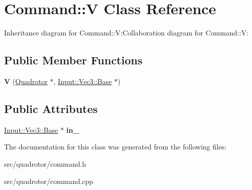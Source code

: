 \hypertarget{classCommand_1_1V}{
\section{Command::V Class Reference}
\label{classCommand_1_1V}
}
Inheritance diagram for Command::V:Collaboration diagram for Command::V:\subsection*{Public Member Functions}
\begin{DoxyCompactItemize}
\item 
\hypertarget{classCommand_1_1V_ab0f8e91d15ed03f3b5320314575c65ff}{
{\bfseries V} (\hyperlink{classQuadrotor}{Quadrotor} $\ast$, \hyperlink{classInput_1_1Vec3_1_1Base}{Input::Vec3::Base} $\ast$)}
\label{classCommand_1_1V_ab0f8e91d15ed03f3b5320314575c65ff}

\end{DoxyCompactItemize}
\subsection*{Public Attributes}
\begin{DoxyCompactItemize}
\item 
\hypertarget{classCommand_1_1V_a5503b80ffdb2daa746bd1d1c6b6c8ffe}{
\hyperlink{classInput_1_1Vec3_1_1Base}{Input::Vec3::Base} $\ast$ {\bfseries in\_\-}}
\label{classCommand_1_1V_a5503b80ffdb2daa746bd1d1c6b6c8ffe}

\end{DoxyCompactItemize}


The documentation for this class was generated from the following files:\begin{DoxyCompactItemize}
\item 
src/quadrotor/command.h\item 
src/quadrotor/command.cpp\end{DoxyCompactItemize}
